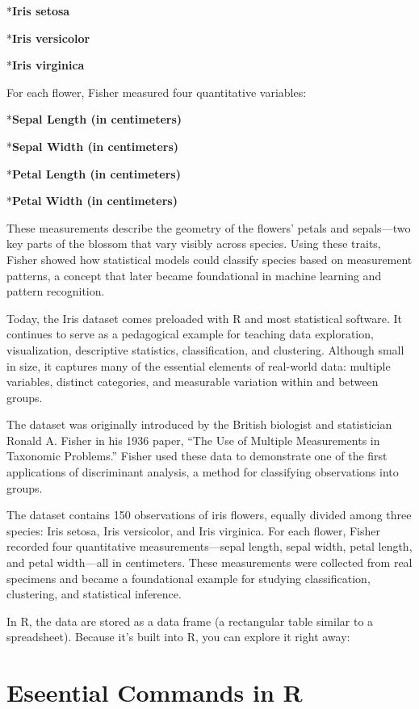 \documentclass[
  letterpaper,
  DIV=11,
  numbers=noendperiod]{scrreprt}
\begin{document}
*\textbf{Iris setosa}

*\textbf{Iris versicolor}

*\textbf{Iris virginica}

For each flower, Fisher measured four quantitative variables:

*\textbf{Sepal Length (in centimeters)}

*\textbf{Sepal Width (in centimeters)}

*\textbf{Petal Length (in centimeters)}

*\textbf{Petal Width (in centimeters)}

These measurements describe the geometry of the flowers' petals and
sepals---two key parts of the blossom that vary visibly across species.
Using these traits, Fisher showed how statistical models could classify
species based on measurement patterns, a concept that later became
foundational in machine learning and pattern recognition.

Today, the Iris dataset comes preloaded with R and most statistical
software. It continues to serve as a pedagogical example for teaching
data exploration, visualization, descriptive statistics, classification,
and clustering. Although small in size, it captures many of the
essential elements of real-world data: multiple variables, distinct
categories, and measurable variation within and between groups.

The dataset was originally introduced by the British biologist and
statistician Ronald A. Fisher in his 1936 paper, ``The Use of Multiple
Measurements in Taxonomic Problems.'' Fisher used these data to
demonstrate one of the first applications of discriminant analysis, a
method for classifying observations into groups.

The dataset contains 150 observations of iris flowers, equally divided
among three species: Iris setosa, Iris versicolor, and Iris virginica.
For each flower, Fisher recorded four quantitative measurements---sepal
length, sepal width, petal length, and petal width---all in centimeters.
These measurements were collected from real specimens and became a
foundational example for studying classification, clustering, and
statistical inference.

In R, the data are stored as a data frame (a rectangular table similar
to a spreadsheet). Because it's built into R, you can explore it right
away:

\section{Eseential Commands in R}\label{eseential-commands-in-r}
\end{document}
